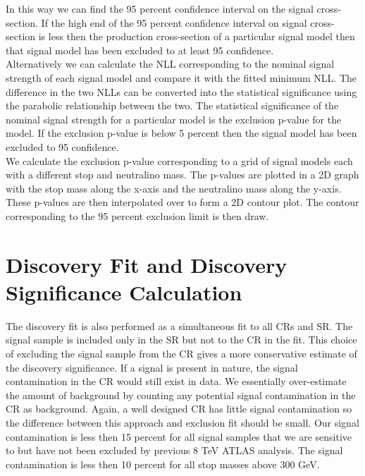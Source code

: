 \indent In this way we can find the 95 percent confidence interval on the signal cross-section.  If the high end of the 95 percent confidence interval on signal cross-section is less then the production cross-section of a particular signal model then that signal model has been excluded to at least 95 confidence.  \\

\indent Alternatively we can calculate the NLL corresponding to the nominal signal strength of each signal model and compare it with the fitted minimum NLL.  The difference in the two NLLs can be converted into the statistical significance using the parabolic relationship between the two.  The statistical significance of the nominal signal strength for a particular model is the exclusion p-value for the model.  If the exclusion p-value is below 5 percent then the signal model has been excluded to 95 confidence. \\

\indent We calculate the exclusion p-value corresponding to a grid of signal models each with a different stop and neutralino mass.  The p-values are plotted in a 2D graph with the stop mass along the x-axis and the neutralino mass along the y-axis.  These p-values are then interpolated over to form a 2D contour plot.  The contour corresponding to the 95 percent exclusion limit is then draw. \\

\section{Discovery Fit and Discovery Significance Calculation}
\label{sec:stat:discovery}

\indent The discovery fit is also performed as a simultaneous fit to all CRs and SR.  The signal sample is included only in the SR but not to the CR in the fit.  This choice of excluding the signal sample from the CR gives a more conservative estimate of the discovery significance.  If a signal is present in nature, the signal contamination in the CR would still exist in data.  We essentially over-estimate the amount of background by counting any potential signal contamination in the CR as background.  Again, a well designed CR has little signal contamination so the difference between this approach and exclusion fit should be small.  Our signal contamination is less then 15 percent for all signal samples that we are sensitive to but have not been excluded by previous 8 TeV ATLAS analysis.  The signal contamination is less then 10 percent for all stop masses above 300 GeV.  \\  

